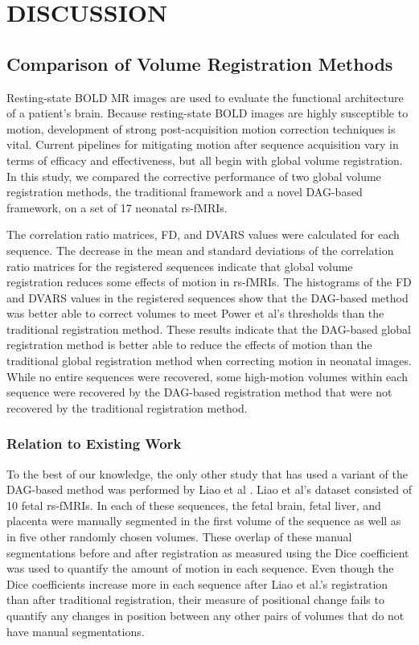 \chapter{DISCUSSION}
\label{ch:discussion}

\section{Comparison of Volume Registration Methods}

Resting-state BOLD MR images are used to evaluate the functional architecture of a patient's brain. Because resting-state BOLD images are highly susceptible to motion, development of strong post-acquisition motion correction techniques is vital. Current pipelines for mitigating motion after sequence acquisition vary in terms of efficacy and effectiveness, but all begin with global volume registration. In this study, we compared the corrective performance of two global volume registration methods, the traditional framework and a novel DAG-based framework, on a set of 17 neonatal rs-fMRIs. 

The correlation ratio matrices, FD, and DVARS values were calculated for each sequence. The decrease in the mean and standard deviations of the correlation ratio matrices for the registered sequences indicate that global volume registration reduces some effects of motion in rs-fMRIs. The histograms of the FD and DVARS values in the registered sequences show that the DAG-based method was better able to correct volumes to meet Power et al’s thresholds than the traditional registration method. These results indicate that the DAG-based global registration method is better able to reduce the effects of motion than the traditional global registration method when correcting motion in neonatal images. While no entire sequences were recovered, some high-motion volumes within each sequence were recovered by the DAG-based registration method that were not recovered by the traditional registration method. 

\subsection{Relation to Existing Work}
To the best of our knowledge, the only other study that has used a variant of the DAG-based method was performed by Liao et al \cite{Liao2016}. Liao et al’s dataset consisted of 10 fetal rs-fMRIs. In each of these sequences, the fetal brain, fetal liver, and placenta were manually segmented in the first volume of the sequence as well as in five other randomly chosen volumes. These overlap of these manual segmentations before and after registration as measured using the Dice coefficient was used to quantify the amount of motion in each sequence. Even though the Dice coefficients increase more in each sequence after Liao et al.’s registration than after traditional registration, their measure of positional change fails to quantify any changes in position between any other pairs of volumes that do not have manual segmentations. 

